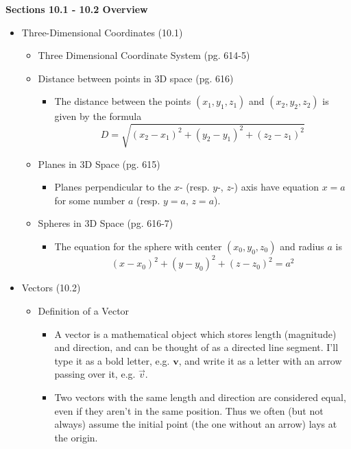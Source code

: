 \documentclass[12pt]{article}
\theoremstyle{plain}
\theoremstyle{definition}
\theoremstyle{remark}
\newcommand{\vect}[1]{\mathbf{#1}}
\begin{document}
\centerline{\bf Sections 10.1 - 10.2 Overview }

\begin{itemize}
\item Three-Dimensional Coordinates (10.1)

	\begin{itemize}
	\item Three Dimensional Coordinate System (pg. 614-5)
	\item Distance between points in 3D space (pg. 616)
		\begin{itemize}
		\item The distance between the points $(x_1,y_1,z_1)$ and $(x_2,y_2,z_2)$ is given by the formula \[D = \sqrt{(x_2 - x_1)^2 + (y_2 - y_1)^2 + (z_2 - z_1)^2}\]
		
		\end{itemize}
		
	\item Planes in 3D Space (pg. 615)
		\begin{itemize}
		\item Planes perpendicular to the $x$- (resp. $y$-, $z$-) axis have equation $x=a$ for some number $a$ (resp. $y=a$, $z=a$).
		\end{itemize}
	
	\item Spheres in 3D Space (pg. 616-7)
		\begin{itemize}
		\item The equation for the sphere with center $(x_0,y_0,z_0)$ and radius $a$ is \[(x-x_0)^2 + (y-y_0)^2 + (z-z_0)^2 = a^2\]
		\end{itemize}
	\end{itemize}

\item Vectors (10.2)
	\begin{itemize}
	\item Definition of a Vector
	
		\begin{itemize}
		\item A vector is a mathematical object which stores length (magnitude) and direction, and can be thought of as a directed line segment. I'll type it as a bold letter, e.g. $\vect{v}$, and write it as a letter with an arrow passing over it, e.g. $\overrightarrow{v}$.
	
		\item Two vectors with the same length and direction are considered equal, even if they aren't in the same position. Thus we often (but not always) assume the initial point (the one without an arrow) lays at the origin.
		\end{itemize}
		

\end{itemize}
\end{itemize}
\end{document}
